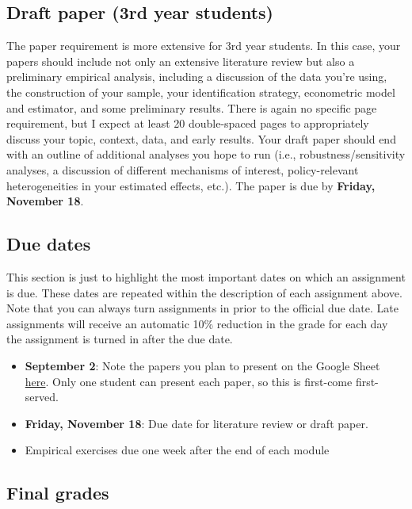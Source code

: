\documentclass[11pt,]{article}
\providecommand{\tightlist}{%
  \setlength{\itemsep}{0pt}\setlength{\parskip}{0pt}}
\begin{document}
\hypertarget{draft-paper-3rd-year-students}{%
\subsection{Draft paper (3rd year
students)}\label{draft-paper-3rd-year-students}}

The paper requirement is more extensive for 3rd year students. In this
case, your papers should include not only an extensive literature review
but also a preliminary empirical analysis, including a discussion of the
data you're using, the construction of your sample, your identification
strategy, econometric model and estimator, and some preliminary results.
There is again no specific page requirement, but I expect at least 20
double-spaced pages to appropriately discuss your topic, context, data,
and early results. Your draft paper should end with an outline of
additional analyses you hope to run (i.e., robustness/sensitivity
analyses, a discussion of different mechanisms of interest,
policy-relevant heterogeneities in your estimated effects, etc.). The
paper is due by \textbf{Friday, November 18}.

\hypertarget{due-dates}{%
\subsection{Due dates}\label{due-dates}}

This section is just to highlight the most important dates on which an
assignment is due. These dates are repeated within the description of
each assignment above. Note that you can always turn assignments in
prior to the official due date. Late assignments will receive an
automatic 10\% reduction in the grade for each day the assignment is
turned in after the due date.

\begin{itemize}
\tightlist
\item
  \textbf{September 2}: Note the papers you plan to present on the
  Google Sheet
  \href{https://docs.google.com/spreadsheets/d/1d6IVg-khbreLKobiczNwEOT9gjPNNykrFEtc2rXdJ4I/edit?usp=sharing}{here}.
  Only one student can present each paper, so this is first-come
  first-served.
\item
  \textbf{Friday, November 18}: Due date for literature review or draft
  paper.
\item
  Empirical exercises due one week after the end of each module
\end{itemize}

\hypertarget{final-grades}{%
\subsection{Final grades}\label{final-grades}}
\end{document}

